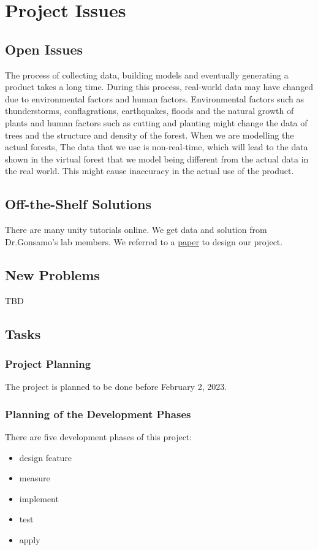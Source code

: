 \documentclass{article}
\begin{document}
\section{Project Issues}
\subsection{Open Issues}
The process of collecting data, building models and eventually generating a product takes a long time. During this process, real-world data may have changed due to environmental factors and human factors. Environmental factors such as thunderstorms, conflagrations, earthquakes, floods and the natural growth of plants and human factors such as cutting and planting might change the data of trees and the structure and density of the forest. When we are modelling the actual forests, The data that we use is non-real-time, which will lead to the data shown in the virtual forest that we model being different from the actual data in the real world. This might cause inaccuracy in the actual use of the product.
\subsection{Off-the-Shelf Solutions}
There are many unity tutorials online.
We get data and solution from Dr.Gonsamo's lab members.
We referred to a \href{https://reader.elsevier.com/reader/sd/pii/S1569843222001881?token=0FD852C628FAE19CABA5E197E8D7ACFF3F2161E405D1A2EC950EE68C39EE00A59ACE7E27C22E4B86F3E04611242D7160&originRegion=us-east-1&originCreation=20220925224650}{paper}  to design our project. 
\subsection{New Problems}
TBD
\subsection{Tasks}
\subsubsection{Project Planning}
The project is planned to be done before February 2, 2023.
\subsubsection{Planning of the Development Phases}
There are five development phases of this project:
\begin{itemize}
    \item design feature
    \item measure
    \item implement
    \item test
    \item apply
\end{itemize}
\end{document}
